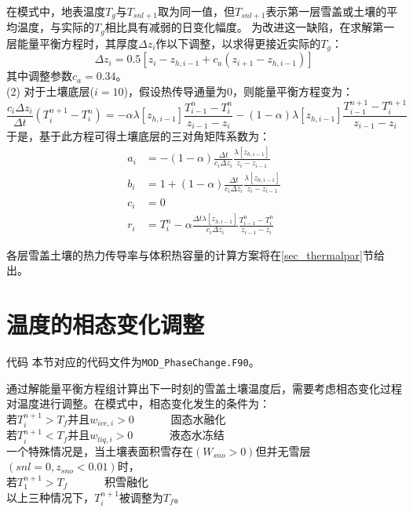 在模式中，地表温度$T_g$与$T_{snl+1}$取为同一值，但$T_{snl+1}$表示第一层雪盖或土壤的平均温度，与实际的$T_g$相比具有减弱的日变化幅度。
为改进这一缺陷，在求解第一层能量平衡方程时，其厚度$\Delta z_i$作以下调整，以求得更接近实际的$T_g$：
\begin{equation}
\Delta z_{i}=0.5\left[z_{i}-z_{h, i-1}+c_{a}\left(z_{i+1}-z_{h, i-1}\right)\right]
\end{equation}
其中调整参数$c_a=0.34$。\\
(2) 对于土壤底层($i=10$)，假设热传导通量为0，则能量平衡方程变为：
\begin{equation}
\frac{c_{i} \Delta z_{i}}{\Delta t}\left(T_{i}^{n+1}-T_{i}^{n}\right)=-\alpha \lambda\left[z_{h, i-1}\right] \frac{T_{i-1}^{n}-T_{i}^{n}}{z_{i-1}-z_{i}}-(1-\alpha) \lambda\left[z_{h, i-1}\right] \frac{T_{i-1}^{n+1}-T_{i}^{n+1}}{z_{i-1}-z_{i}}
\end{equation}
于是，基于此方程可得土壤底层的三对角矩阵系数为：
\begin{equation}
\begin{aligned}
a_{i} &= -(1-\alpha) \frac{\Delta t}{c_{i} \Delta z_{i}} \frac{\lambda\left[z_{h, i-1}\right]}{z_{i}-z_{i-1}} \\
b_{i} &= 1+(1-\alpha) \frac{\Delta t}{c_{i} \Delta z_{i}} \frac{\lambda\left[z_{h, i-1}\right]}{z_{i}-z_{i-1}} \\
c_{i} &= 0 \\
r_{i} &= T_{i}^{n}-\alpha \frac{\Delta t \lambda\left[z_{h, i-1}\right]}{c_{i} \Delta z_{i}} \frac{T_{i-1}^{n}-T_{i}^{n}}{z_{i-1}-z_{i}}
\end{aligned}
\end{equation}

各层雪盖土壤的热力传导率与体积热容量的计算方案将在\ref{sec_thermalpar}节给出。

\section{温度的相态变化调整}

\begin{mymdframed}{代码}
本节对应的代码文件为\texttt{MOD\_PhaseChange.F90}。
\end{mymdframed}

通过解能量平衡方程组计算出下一时刻的雪盖土壤温度后，需要考虑相态变化过程对温度进行调整。在模式中，相态变化发生的条件为：\\
若$T_i^{n+1}>T_f$并且$w_{ice,i}>0$ \ \   \ \  \ \   固态水融化\\
若$T_i^{n+1}<T_f$并且$w_{liq,i}>0$  \ \   \ \  \ \         液态水冻结\\
一个特殊情况是，当土壤表面积雪存在$\left(W_{sno}>0\right)$但并无雪层$\left(snl=0,z_{sno}<0.01\right)$时，\\
若$T_1^{n+1}>T_f$      \ \   \ \  \ \                 积雪融化\\
以上三种情况下，$T_i^{n+1}$被调整为$T_f$。


